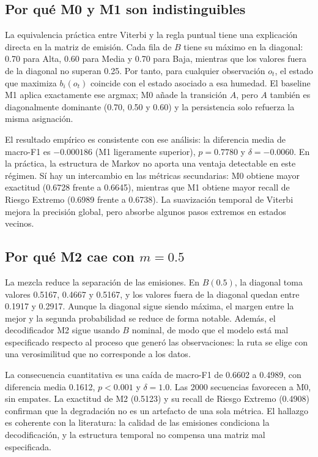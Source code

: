 \documentclass[11pt,letterpaper]{article}
\begin{document}
\subsection{Por qué M0 y M1 son indistinguibles}

La equivalencia práctica entre Viterbi y la regla puntual tiene una explicación directa en la matriz de emisión. Cada fila de \(B\) tiene su máximo en la diagonal: 0.70 para Alta, 0.60 para Media y 0.70 para Baja, mientras que los valores fuera de la diagonal no superan 0.25. Por tanto, para cualquier observación \(o_t\), el estado que maximiza \(b_i(o_t)\) coincide con el estado asociado a esa humedad. El baseline M1 aplica exactamente ese argmax; M0 añade la transición \(A\), pero \(A\) también es diagonalmente dominante (0.70, 0.50 y 0.60) y la persistencia solo refuerza la misma asignación.

El resultado empírico es consistente con ese análisis: la diferencia media de macro-F1 es \(-0.000186\) (M1 ligeramente superior), \(p=0.7780\) y \(\delta=-0.0060\). En la práctica, la estructura de Markov no aporta una ventaja detectable en este régimen. Sí hay un intercambio en las métricas secundarias: M0 obtiene mayor exactitud (0.6728 frente a 0.6645), mientras que M1 obtiene mayor recall de Riesgo Extremo (0.6989 frente a 0.6738). La suavización temporal de Viterbi mejora la precisión global, pero absorbe algunos pasos extremos en estados vecinos.

\subsection{Por qué M2 cae con \(m=0.5\)}

La mezcla reduce la separación de las emisiones. En \(B(0.5)\), la diagonal toma valores 0.5167, 0.4667 y 0.5167, y los valores fuera de la diagonal quedan entre 0.1917 y 0.2917. Aunque la diagonal sigue siendo máxima, el margen entre la mejor y la segunda probabilidad se reduce de forma notable. Además, el decodificador M2 sigue usando \(B\) nominal, de modo que el modelo está mal especificado respecto al proceso que generó las observaciones: la ruta se elige con una verosimilitud que no corresponde a los datos.

La consecuencia cuantitativa es una caída de macro-F1 de 0.6602 a 0.4989, con diferencia media 0.1612, \(p<0.001\) y \(\delta=1.0\). Las 2000 secuencias favorecen a M0, sin empates. La exactitud de M2 (0.5123) y su recall de Riesgo Extremo (0.4908) confirman que la degradación no es un artefacto de una sola métrica. El hallazgo es coherente con la literatura: la calidad de las emisiones condiciona la decodificación, y la estructura temporal no compensa una matriz mal especificada.
\end{document}
